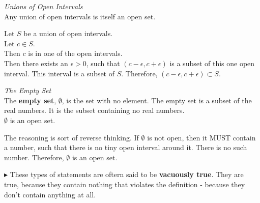 \documentclass{ximera}
\begin{document}
\begin{example}  \textit{Unions of Open Intervals} \\


Any union of open intervals is itself an open set.



\begin{explanation}

Let $S$ be a union of open intervals.  \\
Let $c \in S$. \\
Then $c$ is in one of the open intervals. \\
Then there exists an $\epsilon > 0$, such that $(c - \epsilon, c + \epsilon)$ is a subset of this one open interval.  This interval is a subset of $S$.  Therefore, $(c - \epsilon, c + \epsilon) \subset S$. \\


\end{explanation}

\end{example}















\begin{example}  \textit{The Empty Set} \\


The \textbf{empty set}, $\emptyset$, is the set with no element.  The empty set is a subset of the real numbers.  It is the subset containing no real numbers. \\


$\emptyset$ is an open set. \\



\begin{explanation}


The reasoning is sort of reverse thinking.  If $\emptyset$ is not open, then it MUST contain a number, such that there is no tiny open interval around it.  There is no such number.  Therefore, $\emptyset$ is an open set.


\end{explanation}

\end{example}

$\blacktriangleright$ These types of statements are oftern said to be \textbf{vacuously true}.  They are true, because they contain nothing that violates the definition - because they don't contain anything at all. 
\end{document}
